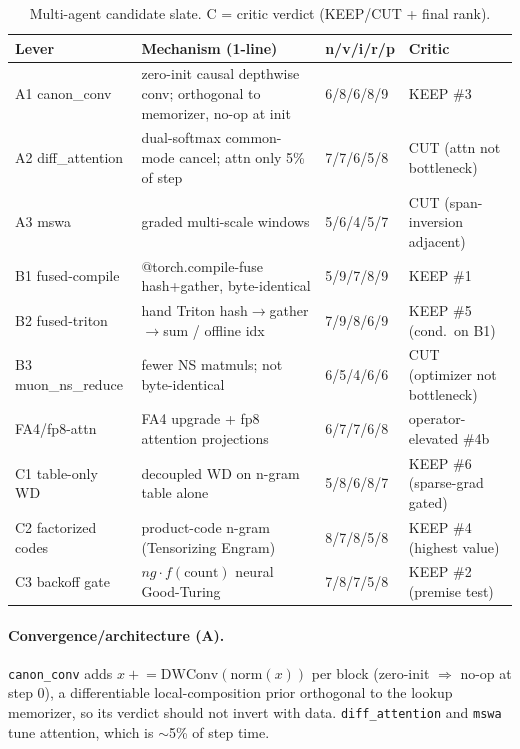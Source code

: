 \documentclass{article}
\begin{document}
\begin{table}[t]\caption{Multi-agent candidate slate. C = critic verdict (KEEP/CUT + final rank).}\label{tab:cand}\vskip 0.1in\begin{center}\begin{small}\begin{tabular}{llll}
\toprule
Lever & Mechanism (1-line) & n/v/i/r/p & Critic \\
\midrule
A1 canon\_conv & zero-init causal depthwise conv; orthogonal to memorizer, no-op at init & 6/8/6/8/9 & KEEP \#3 \\
A2 diff\_attention & dual-softmax common-mode cancel; attn only 5\% of step & 7/7/6/5/8 & CUT (attn not bottleneck) \\
A3 mswa & graded multi-scale windows & 5/6/4/5/7 & CUT (span-inversion adjacent) \\
B1 fused-compile & @torch.compile-fuse hash+gather, byte-identical & 5/9/7/8/9 & KEEP \#1 \\
B2 fused-triton & hand Triton hash$\to$gather$\to$sum / offline idx & 7/9/8/6/9 & KEEP \#5 (cond.\ on B1) \\
B3 muon\_ns\_reduce & fewer NS matmuls; not byte-identical & 6/5/4/6/6 & CUT (optimizer not bottleneck) \\
FA4/fp8-attn & FA4 upgrade + fp8 attention projections & 6/7/7/6/8 & operator-elevated \#4b \\
C1 table-only WD & decoupled WD on n-gram table alone & 5/8/6/8/7 & KEEP \#6 (sparse-grad gated) \\
C2 factorized codes & product-code n-gram (Tensorizing Engram) & 8/7/8/5/8 & KEEP \#4 (highest value) \\
C3 backoff gate & $ng\!\cdot\!f(\mathrm{count})$ neural Good-Turing & 7/8/7/5/8 & KEEP \#2 (premise test) \\
\bottomrule
\end{tabular}\end{small}\end{center}\vskip -0.1in\end{table}

\paragraph{Convergence/architecture (A).} \texttt{canon\_conv} adds $x\mathrel{+}= \mathrm{DWConv}(\mathrm{norm}(x))$ per block (zero-init $\Rightarrow$ no-op at step 0), a differentiable local-composition prior orthogonal to the lookup memorizer, so its verdict should not invert with data. \texttt{diff\_attention} and \texttt{mswa} tune attention, which is $\sim$5\% of step time.
\end{document}
